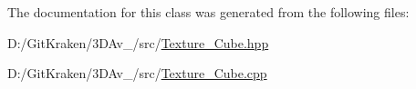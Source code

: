 The documentation for this class was generated from the following files\+:\begin{DoxyCompactItemize}
\item 
D\+:/\+Git\+Kraken/3\+D\+Av\+\_/src/\mbox{\hyperlink{_texture___cube_8hpp}{Texture\+\_\+\+Cube.\+hpp}}\item 
D\+:/\+Git\+Kraken/3\+D\+Av\+\_/src/\mbox{\hyperlink{_texture___cube_8cpp}{Texture\+\_\+\+Cube.\+cpp}}\end{DoxyCompactItemize}

